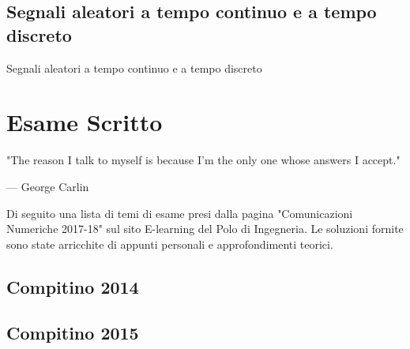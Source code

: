 \documentclass[12pt,oneside,openany]{memoir}
\numberwithin{equation}{subsection}
\begin{document}

\newpage
\section{Segnali aleatori a tempo continuo e a tempo discreto}
Segnali aleatori a tempo continuo e a tempo discreto


\chapter{Esame Scritto}
\epigraph{
	"The reason I talk to myself is because I'm the only one whose answers I
	accept."
}{--- \textup{George Carlin}}

Di seguito una lista di temi di esame presi dalla pagina "Comunicazioni
Numeriche 2017-18" sul sito E-learning del Polo di Ingegneria. Le soluzioni
fornite sono state arricchite di appunti personali e approfondimenti teorici.


\newpage
\section{Compitino 2014}


\newpage
\section{Compitino 2015}

\end{document}
